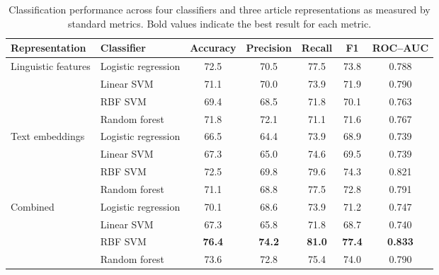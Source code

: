 \documentclass[11pt,letterpaper]{article}
\begin{document}
\begin{table}[t]
\centering
\caption{Classification performance across four classifiers and three article representations as measured by standard metrics. Bold values indicate the best result for each metric.}
\label{tab:model-performance}

\small
\setlength{\tabcolsep}{4.5pt}

\begin{tabular}{llccccc}
\toprule
Representation &
Classifier &
Accuracy &
Precision &
Recall &
F1 &
ROC--AUC \\
\midrule

Linguistic features
    & Logistic regression
    & 72.5 & 70.5 & 77.5 & 73.8 & 0.788 \\

    & Linear SVM
    & 71.1 & 70.0 & 73.9 & 71.9 & 0.790 \\

    & RBF SVM
    & 69.4 & 68.5 & 71.8 & 70.1 & 0.763 \\

    & Random forest
    & 71.8 & 72.1 & 71.1 & 71.6 & 0.767 \\

\addlinespace

Text embeddings
    & Logistic regression
    & 66.5 & 64.4 & 73.9 & 68.9 & 0.739 \\

    & Linear SVM
    & 67.3 & 65.0 & 74.6 & 69.5 & 0.739 \\

    & RBF SVM
    & 72.5 & 69.8 & 79.6 & 74.3 & 0.821 \\

    & Random forest
    & 71.1 & 68.8 & 77.5 & 72.8 & 0.791 \\

\addlinespace

Combined
    & Logistic regression
    & 70.1 & 68.6 & 73.9 & 71.2 & 0.747 \\

    & Linear SVM
    & 67.3 & 65.8 & 71.8 & 68.7 & 0.740 \\

    & RBF SVM
    & \textbf{76.4}
    & \textbf{74.2}
    & \textbf{81.0}
    & \textbf{77.4}
    & \textbf{0.833} \\

    & Random forest
    & 73.6 & 72.8 & 75.4 & 74.0 & 0.790 \\

\bottomrule
\end{tabular}
\end{table}
\end{document}
